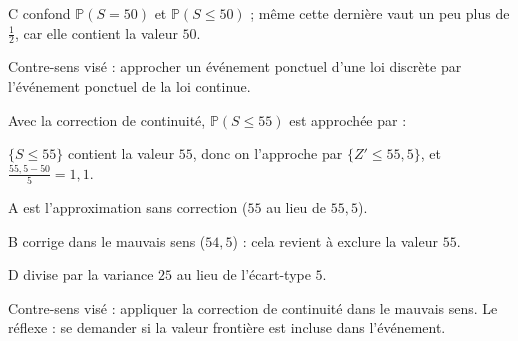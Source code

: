 {\begin{question}
\begin{explanations}
C confond $\mathbb{P}(S = 50)$ et $\mathbb{P}(S \leq 50)$ ; même cette dernière vaut un peu plus de $\frac12$, car elle contient la valeur $50$.

Contre-sens visé : approcher un événement ponctuel d'une loi discrète par
l'événement ponctuel de la loi continue.
\end{explanations}
\end{question}

\begin{question}
Avec la correction de continuité, $\mathbb{P}(S \leq 55)$ est approchée par :
\begin{answers}
\end{answers}
\begin{explanations}
$\{S \leq 55\}$ contient la valeur $55$, donc on
l'approche par $\{Z' \leq 55{,}5\}$, et $\frac{55{,}5 - 50}{5} = 1{,}1$.

A est l'approximation sans correction ($55$ au lieu de $55{,}5$).

B corrige dans le mauvais sens ($54{,}5$) : cela revient à exclure la valeur $55$.

D divise par la variance $25$ au lieu de l'écart-type $5$.

Contre-sens visé : appliquer la correction de continuité dans le mauvais
sens. Le réflexe : se demander si la valeur frontière est incluse dans
l'événement.
\end{explanations}
\end{question}
}
